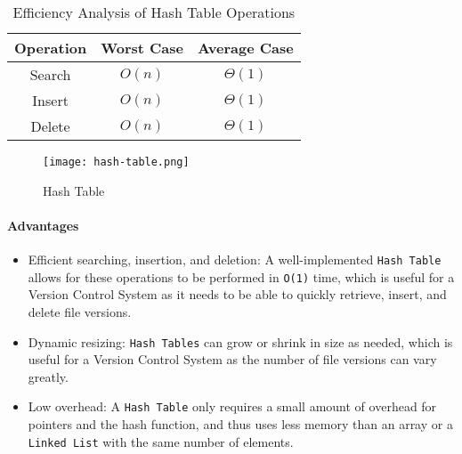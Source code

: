 \begin{table}[h]
    \centering
    \caption{Efficiency Analysis of Hash Table Operations}
    \label{tab:hash-table-efficiency-analysis}
    \begin{tabular}{|c|c|c|}
        \hline
        Operation & Worst Case & Average Case \\ \hline
        Search    & $O(n)$     & $\Theta(1)$  \\ \hline
        Insert    & $O(n)$     & $\Theta(1)$  \\ \hline
        Delete    & $O(n)$     & $\Theta(1)$  \\ \hline
    \end{tabular}
\end{table}
\begin{figure}[!htbp]
    \centering
    \texttt{[image: hash-table.png]}
    \caption{Hash Table \cite{stemmler_2022}}
    \label{fig:hash-table}
\end{figure}
\newpage

\paragraph{Advantages}
\begin{itemize}
    \item Efficient searching, insertion, and deletion: A well-implemented \lstinline{Hash Table} allows for these operations to be performed in \lstinline{O(1)} time, which is useful for a Version Control System as it needs to be able to quickly retrieve, insert, and delete file versions.
    \item Dynamic resizing: \lstinline{Hash Tables} can grow or shrink in size as needed, which is useful for a Version Control System as the number of file versions can vary greatly.
    \item Low overhead: A \lstinline{Hash Table} only requires a small amount of overhead for pointers and the hash function, and thus uses less memory than an array or a \lstinline{Linked List} with the same number of elements.
\end{itemize}
